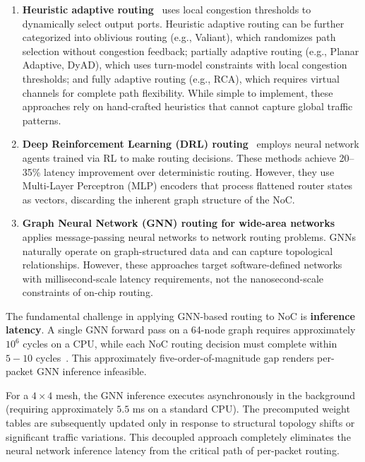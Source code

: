 \begin{enumerate}
    \item \textbf{Heuristic adaptive routing}~\cite{dyad2004,ebrahimi2019} uses local congestion thresholds to dynamically select output ports. Heuristic adaptive routing can be further categorized into oblivious routing (e.g., Valiant), which randomizes path selection without congestion feedback; partially adaptive routing (e.g., Planar Adaptive, DyAD), which uses turn-model constraints with local congestion thresholds; and fully adaptive routing (e.g., RCA), which requires virtual channels for complete path flexibility. While simple to implement, these approaches rely on hand-crafted heuristics that cannot capture global traffic patterns.
    
    \item \textbf{Deep Reinforcement Learning (DRL) routing}~\cite{wang2022maar,deepnr2022,garnn2023} employs neural network agents trained via RL to make routing decisions. These methods achieve 20--35\% latency improvement over deterministic routing. However, they use Multi-Layer Perceptron (MLP) encoders that process flattened router states as vectors, discarding the inherent graph structure of the NoC.
    
    \item \textbf{Graph Neural Network (GNN) routing for wide-area networks}~\cite{g-routing2023,drl-gnn2019} applies message-passing neural networks to network routing problems. GNNs naturally operate on graph-structured data and can capture topological relationships. However, these approaches target software-defined networks with millisecond-scale latency requirements, not the nanosecond-scale constraints of on-chip routing.
\end{enumerate}

The fundamental challenge in applying GNN-based routing to NoC is \textbf{inference latency}. A single GNN forward pass on a 64-node graph requires approximately $10^6$ cycles on a CPU, while each NoC routing decision must complete within $5-10$ cycles~\cite{wang2022maar}. This approximately five-order-of-magnitude gap renders per-packet GNN inference infeasible.

For a $4\times4$ mesh, the GNN inference executes asynchronously in the background (requiring approximately $5.5$ ms on a standard CPU). The precomputed weight tables are subsequently updated only in response to structural topology shifts or significant traffic variations. This decoupled approach completely eliminates the neural network inference latency from the critical path of per-packet routing.

